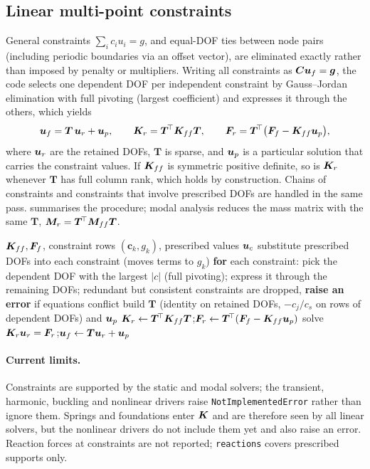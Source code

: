\subsection{Linear multi-point constraints}
General constraints $\sum_i c_i u_i=g$, and equal-DOF ties between node pairs (including periodic boundaries via an offset vector), are eliminated exactly rather than imposed by penalty or multipliers.
Writing all constraints as $\bm C\bm{u}_f=\bm g$, the code selects one dependent DOF per independent constraint by Gauss--Jordan elimination with full pivoting (largest coefficient) and expresses it through the others, which
yields
\begin{equation}
  \bm{u}_f=\bm T\,\bm{u}_r+\bm{u}_p,\qquad
  \bm{K}_r=\bm T^{\!\top}\bm{K}_{ff}\bm T,\qquad
  \bm{F}_r=\bm T^{\!\top}\bigl(\bm{F}_f-\bm{K}_{ff}\bm{u}_p\bigr),
  \label{eq:elim}
\end{equation}
where $\bm{u}_r$ are the retained DOFs, $\bm T$ is sparse, and $\bm{u}_p$ is a particular solution that carries the constraint values. If $\bm{K}_{ff}$ is symmetric positive definite, so is $\bm{K}_r$ whenever $\bm T$
has full column rank, which holds by construction. Chains of constraints and constraints that involve prescribed DOFs are handled in the same pass.
 summarises the procedure; modal analysis reduces the mass matrix with the same $\bm T$, $\bm{M}_r=\bm T^{\!\top}\bm{M}_{ff}\bm T$.

\begin{algorithm}[t]
\caption{Exact elimination of linear constraints}\label{alg:elim}
\begin{algorithmic}[1]
\Require $\bm{K}_{ff},\bm{F}_f$, constraint rows $(\bm c_k,g_k)$, prescribed values $\bm{u}_c$
\State substitute prescribed DOFs into each constraint (moves terms to $g_k$)
\State \textbf{for} each constraint: pick the dependent DOF with the largest $|c|$ (full pivoting); express it through the remaining DOFs; redundant but consistent constraints are dropped, \textbf{raise an error} if equations conflict
\State build $\bm T$ (identity on retained DOFs, $-c_j/c_s$ on rows of dependent DOFs) and $\bm{u}_p$
\State $\bm{K}_r\gets\bm T^{\!\top}\bm{K}_{ff}\bm T$;\quad $\bm{F}_r\gets\bm T^{\!\top}(\bm{F}_f-\bm{K}_{ff}\bm{u}_p)$
\State solve $\bm{K}_r\bm{u}_r=\bm{F}_r$;\quad $\bm{u}_f\gets\bm T\bm{u}_r+\bm{u}_p$
\end{algorithmic}
\end{algorithm}

\paragraph{Current limits.}
Constraints are supported by the static and modal solvers; the transient, harmonic, buckling and nonlinear drivers raise \texttt{NotImplementedError} rather than ignore them.
Springs and foundations enter $\bm{K}$ and are therefore seen by all linear solvers, but the nonlinear drivers do not include them yet and also raise an error.
Reaction forces at constraints are not reported; \texttt{reactions} covers prescribed supports only.
